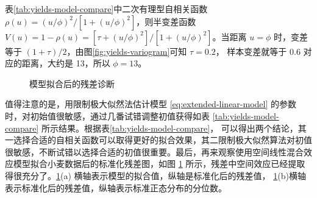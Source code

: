\documentclass[12pt,a4paper,UTF8,twoside]{book}
\theoremstyle{definition}
\theoremstyle{definition}
\theoremstyle{definition}
\theoremstyle{remark}
\begin{document}
表\ref{tab:yields-model-compare}中二次有理型自相关函数 \(\rho(u) = (u/\phi)^2/[1 + (u/\phi)^2]\)，则半变差函数 \(V(u) = 1-\rho(u) = [\tau + (u/\phi)^2]/[1 + (u/\phi)^2]\)。当距离 \(u = \phi\) 时，变差等于 \((1+\tau)/2\)，由图\ref{fig:yields-variogram}可知 \(\tau = 0.2\)， 样本变差就等于 0.6 对应的距离，大约是 13，所以 \(\phi=13\)。

\begin{figure}

{\centering {}

}

\caption{模型拟合后的残差诊断}\label{fig:model-check}
\end{figure}

值得注意的是，用限制极大似然法估计模型 \eqref{eq:extended-linear-model} 的参数时，对初始值很敏感，通过几番试错调整初值获得如表 \ref{tab:yields-model-compare} 所示结果。根据表\ref{tab:yields-model-compare}， 可以得出两个结论，其一选择合适的自相关函数可以取得更好的拟合效果，其二限制极大似然算法对初值很敏感，不断试错以选择合适的初值很重要。最后，再来观察使用空间线性混合效应模型拟合小麦数据后的标准化残差图，如图 \ref{fig:model-check} 所示，残差中空间效应已经提取得很充分了。\ref{fig:model-check}(a) 横轴表示模型的拟合值，纵轴是标准化后的残差值， \ref{fig:model-check}(b)横轴表示标准化后的残差值，纵轴表示标准正态分布的分位数。
\end{document}

